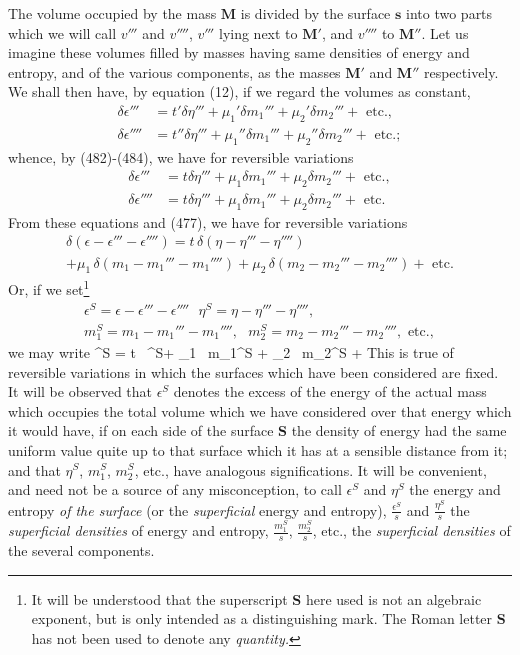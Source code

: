 \documentclass[12pt]{article}
\newcommand{\dd}{\delta}
\begin{document}
{The volume occupied by the mass $\mathbf{M}$ is divided by the surface $\mathbf{s}$ into two parts which we will call $v'''$ and $v''''$, $v'''$ lying next to $\mathbf{M}'$, and $v''''$ to $\mathbf{M}''$. Let us imagine these volumes filled by masses having same densities of energy and entropy, and of the various components, as the masses $\mathbf{M}'$ and $\mathbf{M}''$ respectively. We shall then have, by equation (12), if we regard the volumes as constant,
\begin{align}
\dd \epsilon''' &= t'\dd \eta''' + \mu_1' \dd m_1'''+ \mu_2' \dd m_2''' + \text{ etc.},  \label{485} \\
\dd \epsilon'''' &= t''\dd \eta''' + \mu_1'' \dd m_1'''+ \mu_2'' \dd m_2'''  + \text{ etc.}; \label{486} \end{align}
whence, by (482)-(484), we have for reversible variations
\begin{align}
\dd \epsilon''' &= t\dd \eta''' + \mu_1 \dd m_1'''+ \mu_2 \dd m_2''' + \text{ etc.},  \label{487} \\
\dd \epsilon'''' &= t\dd \eta''' + \mu_1 \dd m_1'''+ \mu_2 \dd m_2''' +\text{ etc.}  \label{488} \end{align}
From these equations and (477), we have for reversible variations
\begin{multline}
\dd(\epsilon-\epsilon'''-\epsilon'''') = t \, \dd(\eta-\eta'''-\eta'''') \\
+ \mu_1 \, \dd(m_1-m_1'''-m_1'''')+ \mu_2 \,\dd(m_2-m_2'''-m_2'''')+ \text{ etc.} \label{489} \end{multline}
Or, if we set\footnote{It will be understood that the superscript $\mathbf{S}$ here used is not an algebraic exponent, but is only intended as a distinguishing mark. The Roman letter $\mathbf{S}$ has not been used to denote any \textit{quantity.}}
\begin{gather}
\epsilon^S =\epsilon-\epsilon'''-\epsilon'''' \ \ \ \eta^ S=\eta-\eta'''-\eta'''',\label{490} \\
m_1^S = m_1-m_1'''-m_1'''', \ \ \ m_2^S = m_2-m_2'''-m_2'''', \text{ etc.}, \label{491} \end{gather}
we may write
\eqs \dd \epsilon^S = t \, \dd \eta^S+ \mu_1 \, \dd m_1^S + \mu_2 \, \dd m_2^S +    \label{492} \eqe
This is true of reversible variations in which the surfaces which have been considered are fixed. It will be observed that $\epsilon^S$ denotes the excess of the energy of the actual mass which occupies the total volume which we have considered over that energy which it would have, if on each side of the surface $\mathbf{S}$ the density of energy had the same uniform value quite up to that surface which it has at a sensible distance from it; and that $\eta^S$, $m_1^S$, $m_2^S$, etc., have analogous significations. It will be convenient, and need not be a source of any misconception, to call $\epsilon^S$ and $\eta^S$ the energy and entropy \textit{of the surface} (or the \textit{superficial} energy and entropy), $\frac{\epsilon^S}{s}$ and $\frac{\eta^S}{s}$ the \textit{superficial densities} of energy and entropy, $\frac{m_1^S}{s}$, $\frac{m_2^S}{s}$, etc., the \textit{superficial densities} of the several components.


}
\end{document}

